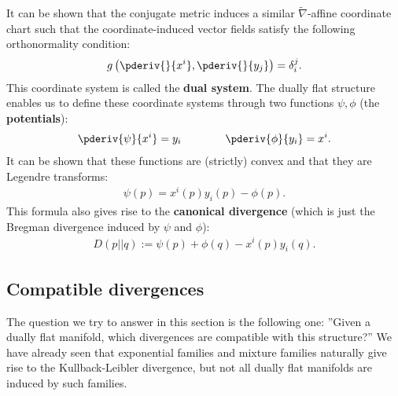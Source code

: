     It can be shown that the conjugate metric induces a similar $\widetilde{\nabla}$-affine coordinate chart such that the coordinate-induced vector fields satisfy the following orthonormality condition:
    \begin{gather}
        g\left(\pderiv{}{x^i}, \pderiv{}{y_j}\right) = \delta^j_i.
    \end{gather}
    This coordinate system is called the \textbf{dual system}. The dually flat structure enables us to define these coordinate systems through two functions $\psi,\phi$ (the \textbf{potentials}):
    \begin{gather}
        \pderiv{\psi}{x^i} = y_i\qquad\qquad \pderiv{\phi}{y_i}=x^i.
    \end{gather}
    It can be shown that these functions are (strictly) convex and that they are Legendre transforms:
    \begin{gather}
        \psi(p) = x^i(p)y_i(p)-\phi(p).
    \end{gather}
    This formula also gives rise to the \textbf{canonical divergence} (which is just the Bregman divergence induced by $\psi$ and $\phi$):
    \begin{gather}
        D(p||q) := \psi(p) + \phi(q) - x^i(p)y_i(q).
    \end{gather}

\subsection{Compatible divergences}

    The question we try to answer in this section is the following one: ''Given a dually flat manifold, which divergences are compatible with this structure?'' We have already seen that exponential families and mixture families naturally give rise to the Kullback-Leibler divergence, but not all dually flat manifolds are induced by such families.

